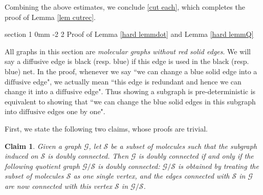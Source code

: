 \documentclass{article}
\makeatletter
\newcommand{\1}{\mathds{1}}
\numberwithin{equation}{section}
\renewcommand{\cal}{\mathcal}
\newcommand{\dashed}{\text{diffusive}}
\theoremstyle{plain} %
\newtheorem{claim}[theorem]{Claim}
\theoremstyle{remark}
\renewcommand{\section}{\@startsection
	{section}%
	{1}%
	{0mm}%
	{-2\baselineskip}%
	{2\baselineskip}%
	{\normalfont\large\scshape\centering}} %
\makeatother
\begin{document}
\medskip
Combining the above estimates, we conclude \eqref{cut each}, which completes the proof of Lemma \ref{lem cutrec}.



\appendix


\section{Proof of Lemma \ref{hard lemmdot} and Lemma \ref{hard lemmQ}}\label{sec PDG}

All graphs in this section are \emph{molecular graphs without red solid edges}. %
We will say a diffusive edge is black (resp. blue) if this edge is used in the black (resp. blue) net.   
In the proof, whenever we say ``we can change a blue solid edge into a $\dashed$ edge", we actually mean ``this edge is redundant and hence we can change it into a $\dashed$ edge". Thus showing a subgraph is pre-deterministic is equivalent to showing that ``we can change the blue solid edges in this subgraph into $\dashed$ edges one by one". %

First, we state the following two claims, whose proofs are trivial.
\begin{claim}\label{trivial_graph1}
Given a graph $\cal G$, let $\cal S$ be a subset of molecules such that the subgraph induced on $\cal S$ is doubly connected. Then $\cal G$ is doubly connected if and only if the following quotient graph $\cal G/\cal S$ is doubly connected: $\cal G/\cal S$ is obtained by treating the subset of molecules $\cal S$ as one single vertex, and the edges connected with $\cal S$ in $\cal G$ are now connected with this vertex $\cal S$ in $\cal G/\cal S$. 
\end{claim}
\end{document}
